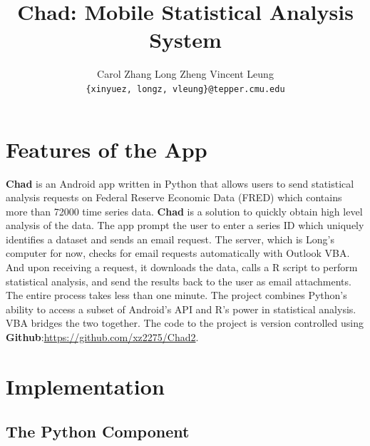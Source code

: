 \documentclass[12pt]{article}
\title{Chad: Mobile Statistical Analysis System}
\author{
Carol Zhang \hspace{0.5cm} Long Zheng \hspace{0.5cm} Vincent Leung \\
\texttt{\{xinyuez, longz, vleung\}@tepper.cmu.edu}
}
\begin{document}
\maketitle


\section{Features of the App}
\label{sec:introduction}

\textbf{Chad} is an Android app written in Python that allows users to send statistical analysis requests on Federal Reserve Economic Data (FRED) which contains more than 72000 time series data.
\textbf{Chad} is a solution to quickly obtain high level analysis of the data. 
The app prompt the user to enter a series ID which uniquely identifies a dataset and sends an email request.
The server, which is Long's computer for now, checks for email requests automatically with Outlook VBA.
And upon receiving a request, it downloads the data, calls a R script to perform statistical analysis, and send the results back to the user as email attachments. 
The entire process takes less than one minute.
The project combines Python's ability to access a subset of Android's API and R's power in statistical analysis. 
VBA bridges the two together. 
The code to the project is version controlled using \textbf{Github}:\url{https://github.com/xz2275/Chad2}.

\section{Implementation}

\subsection{The Python Component}
\end{document}
